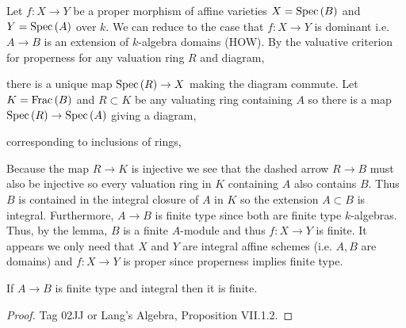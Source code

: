 \documentclass[12pt]{article}
\begin{document}
Let $f : X \to Y$ be a proper morphism of affine varieties $X = \mathrm{Spec}\left( B \right)$ and $Y = \mathrm{Spec}\left( A \right)$ over $k$. We can reduce to the case that $f : X \to Y$ is dominant i.e. $A \to B$ is an extension of $k$-algebra domains (HOW). By the valuative criterion for properness for any valuation ring $R$ and diagram,
\begin{center}
\end{center}
there is a unique map $\mathrm{Spec}\left( R \right) \to X$ making the diagram commute. Let $K = \mathrm{Frac}\left(B\right)$ and $R \subset K$ be any valuating ring containing $A$ so there is a map $\mathrm{Spec}\left( R \right) \to \mathrm{Spec}\left( A \right)$ giving a diagram,
\begin{center}
\end{center}
corresponding to inclusions of rings,
\begin{center}
\end{center}
Because the map $R \to K$ is injective we see that the dashed arrow $R \to B$ must also be injective so every valuation ring in $K$ containing $A$ also contains $B$. Thus $B$ is contained in the integral closure of $A$ in $K$ so the extension $A \subset B$ is integral. Furthermore, $A \to B$ is finite type since both are finite type $k$-algebras. Thus, by the lemma, $B$ is a finite $A$-module and thus $f : X \to Y$ is finite. It appears we only need that $X$ and $Y$ are integral affine schemes (i.e. $A, B$ are domains) and $f : X \to Y$ is proper since properness implies finite type.

\begin{lemma}
If $A \to B$ is finite type and integral then it is finite.
\end{lemma}

\begin{proof}
Tag 02JJ or Lang's Algebra, Proposition VII.1.2.
\end{proof}
\end{document}
